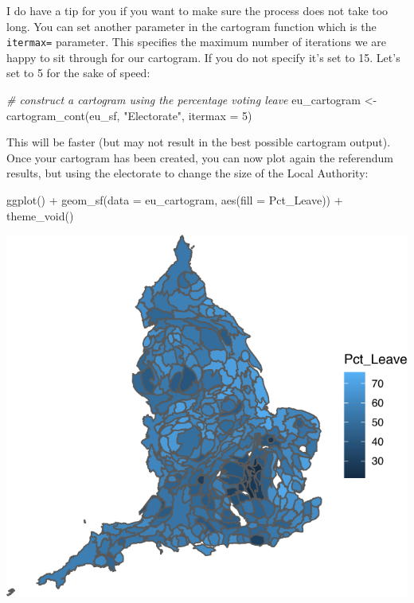 \documentclass[
  krantz2]{krantz}
\makeatletter
\newenvironment{Shaded}{\begin{snugshade}}{\end{snugshade}}
\newcommand{\AttributeTok}[1]{\textcolor[rgb]{0.61,0.61,0.61}{#1}}
\newcommand{\CommentTok}[1]{\textcolor[rgb]{0.37,0.37,0.37}{\textit{#1}}}
\newcommand{\DecValTok}[1]{\textcolor[rgb]{0.06,0.06,0.06}{#1}}
\newcommand{\FunctionTok}[1]{\textcolor[rgb]{0,0,0}{#1}}
\newcommand{\NormalTok}[1]{#1}
\newcommand{\OtherTok}[1]{\textcolor[rgb]{0.37,0.37,0.37}{#1}}
\newcommand{\SpecialCharTok}[1]{\textcolor[rgb]{0,0,0}{#1}}
\newcommand{\StringTok}[1]{\textcolor[rgb]{0.5,0.5,0.5}{#1}}
\newenvironment{kframe}{%
\medskip{}
\setlength{\fboxsep}{.8em}
 \def\at@end@of@kframe{}%
 \ifinner\ifhmode%
  \def\at@end@of@kframe{\end{minipage}}%
  \begin{minipage}{\columnwidth}%
 \fi\fi%
 \def\FrameCommand##1{\hskip\@totalleftmargin \hskip-\fboxsep
 \colorbox{shadecolor}{##1}\hskip-\fboxsep
     \hskip-\linewidth \hskip-\@totalleftmargin \hskip\columnwidth}%
 \MakeFramed {\advance\hsize-\width
   \@totalleftmargin\z@ \linewidth\hsize
   \@setminipage}}%
 {\par\unskip\endMakeFramed%
 \at@end@of@kframe}
\renewenvironment{Shaded}{\begin{kframe}}{\end{kframe}}
\makeatother
\begin{document}
I do have a tip for you if you want to make sure the process does not take too long. You can set another parameter in the cartogram function which is the \texttt{itermax=} parameter. This specifies the maximum number of iterations we are happy to sit through for our cartogram. If you do not specify it's set to 15. Let's set to 5 for the sake of speed:

\begin{Shaded}
\begin{Highlighting}[]
\CommentTok{\# construct a cartogram using the percentage voting leave}
\NormalTok{eu\_cartogram }\OtherTok{\textless{}{-}} \FunctionTok{cartogram\_cont}\NormalTok{(eu\_sf, }\StringTok{"Electorate"}\NormalTok{, }\AttributeTok{itermax =} \DecValTok{5}\NormalTok{)}
\end{Highlighting}
\end{Shaded}

This will be faster (but may not result in the best possible cartogram output). Once your cartogram has been created, you can now plot again the referendum results, but using the electorate to change the size of the Local Authority:

\begin{Shaded}
\begin{Highlighting}[]
\FunctionTok{ggplot}\NormalTok{() }\SpecialCharTok{+}
  \FunctionTok{geom\_sf}\NormalTok{(}\AttributeTok{data =}\NormalTok{ eu\_cartogram, }\FunctionTok{aes}\NormalTok{(}\AttributeTok{fill =}\NormalTok{ Pct\_Leave)) }\SpecialCharTok{+} 
  \FunctionTok{theme\_void}\NormalTok{()}
\end{Highlighting}
\end{Shaded}

\includegraphics{crime_mapping_files/figure-latex/unnamed-chunk-137-1.pdf}
\end{document}
